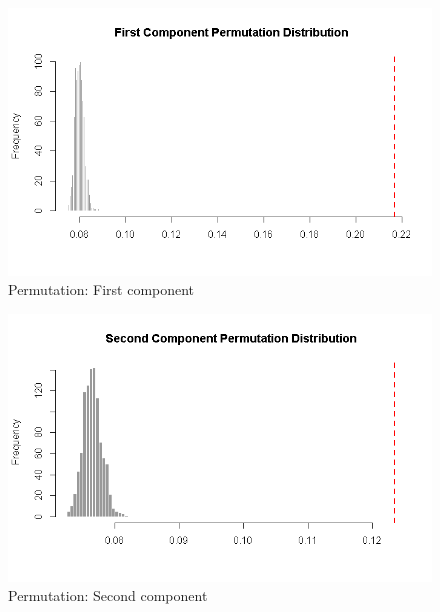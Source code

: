 \documentclass[
  ignorenonframetext,
]{beamer}
\begin{document}
\begin{frame}

\begin{figure}
\centering
\includegraphics{../Images/Perm1.png}
\caption{Permutation: First component}
\end{figure}

\end{frame}

\begin{frame}

\begin{figure}
\centering
\includegraphics{../Images/Perm2.png}
\caption{Permutation: Second component}
\end{figure}

\end{frame}
\end{document}

